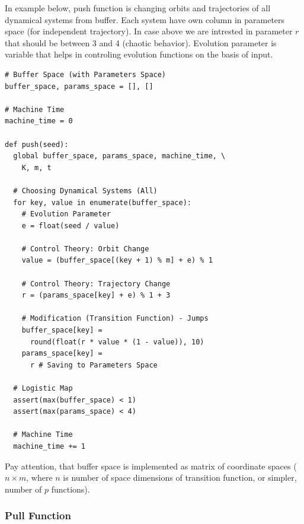 \documentclass[twocolumn, a4paper, 10pt]{article}
\begin{document}
In example below, push function is changing orbits and trajectories of all dynamical systems from buffer. Each system have own column in parameters space (for independent trajectory). In case above we are intrested in parameter $r$ that should be between 3 and 4 (chaotic behavior). Evolution parameter is variable that helps in controling evolution functions on the basis of input.

\begin{lstlisting}[style=codeAppendix, numbers=none]
# Buffer Space (with Parameters Space)
buffer_space, params_space = [], []

# Machine Time
machine_time = 0

def push(seed):
  global buffer_space, params_space, machine_time, \
    K, m, t

  # Choosing Dynamical Systems (All)
  for key, value in enumerate(buffer_space):
    # Evolution Parameter
    e = float(seed / value)

    # Control Theory: Orbit Change
    value = (buffer_space[(key + 1) % m] + e) % 1

    # Control Theory: Trajectory Change
    r = (params_space[key] + e) % 1 + 3

    # Modification (Transition Function) - Jumps
    buffer_space[key] =
      round(float(r * value * (1 - value)), 10)
    params_space[key] =
      r # Saving to Parameters Space

  # Logistic Map
  assert(max(buffer_space) < 1)
  assert(max(params_space) < 4)

  # Machine Time
  machine_time += 1
\end{lstlisting}

Pay attention, that buffer space is implemented as matrix of coordinate spaces ($n \times m$, where $n$ is number of space dimensions of transition function, or simpler, number of $p$ functions).

\subsubsection{Pull Function}
\end{document}
